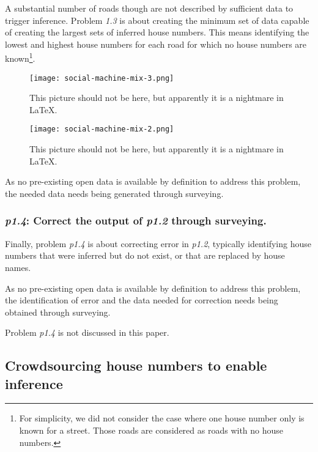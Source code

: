         A substantial number of roads though are not described by sufficient data to trigger inference. Problem {\it 1.3} is about creating the minimum set of data capable of creating the largest sets of inferred house numbers. This means identifying the lowest and highest house numbers for each road for which no house numbers are known\footnote{For simplicity, we did not consider the case where one house number only is known for a street. Those roads are considered as roads with no house numbers.}.

        \begin{figure*}
        	\texttt{[image: social-machine-mix-3.png]}
        	\caption{This picture should not be here, but apparently it is a nightmare in LaTeX.}
        	\label{fig:social_machine_mix_3}
        \end{figure*}
        
        \begin{figure*}
        	\texttt{[image: social-machine-mix-2.png]}
        	\caption{This picture should not be here, but apparently it is a nightmare in LaTeX.}
        	\label{fig:social_machine_mix_2}
        \end{figure*}
        
        As no pre-existing open data is available by definition to address this problem, the needed data needs being generated through surveying. 

    \subsubsection{{\it p1.4}: Correct the output of {\it p1.2} through surveying.} 

        Finally, problem {\it p1.4} is about correcting error in {\it p1.2}, typically identifying house numbers that were inferred but do not exist, or that are replaced by house names.
        
        As no pre-existing open data is available by definition to address this problem, the identification of error and the data needed for correction needs being obtained through surveying. 

        Problem {\it p1.4} is not discussed in this paper.

\subsection{Crowdsourcing house numbers to enable inference}

